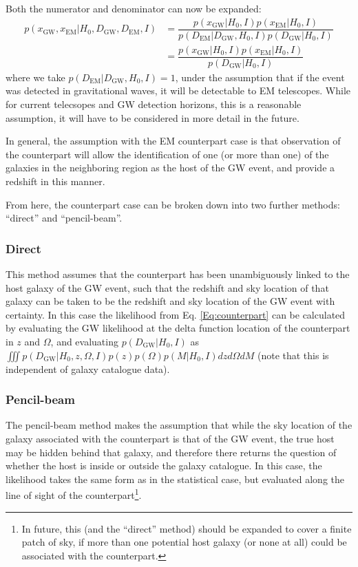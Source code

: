 \documentclass[a4paper,10pt]{article}
\begin{document}
Both the numerator and denominator can now be expanded:
\begin{equation} \label{Eq:counterpart}
\begin{aligned}
p(x_{\text{GW}},x_{\text{EM}}|H_0,D_{\text{GW}},D_{\text{EM}},I) &= \dfrac{p(x_{\text{GW}}|H_0,I) p(x_{\text{EM}}|H_0,I)}{p(D_{\text{EM}}|D_{\text{GW}},H_0,I) p(D_{\text{GW}}|H_0,I)} 
\\ &= \dfrac{p(x_{\text{GW}}|H_0,I) p(x_{\text{EM}}|H_0,I)}{p(D_{\text{GW}}|H_0,I)} 
\end{aligned} 
\end{equation}
where we take $p(D_{\text{EM}}|D_{\text{GW}},H_0,I) = 1$, under the assumption that if the event was detected in gravitational waves, it will be detectable to EM telescopes.  While for current telecsopes and GW detection horizons, this is a reasonable assumption, it will have to be considered in more detail in the future.

In general, the assumption with the EM counterpart case is that observation of the counterpart will allow the identification of one (or more than one) of the galaxies in the neighboring region as the host of the GW event, and provide a redshift in this manner.

From here, the counterpart case can be broken down into two further methods: ``direct'' and ``pencil-beam''. 

\subsubsection{Direct}
This method assumes that the counterpart has been unambiguously linked to the host galaxy of the GW event, such that the redshift and sky location of that galaxy can be taken to be the redshift and sky location of the GW event with certainty.  In this case the likelihood from Eq. \ref{Eq:counterpart} can be calculated by evaluating the GW likelihood at the delta function location of the counterpart in $z$ and $\Omega$, and evaluating $p(D_{\text{GW}}|H_0,I)$ as $\iiint p(D_{\text{GW}}|H_0,z,\Omega,I) p(z)p(\Omega)p(M|H_0,I) dz d\Omega dM$ (note that this is independent of galaxy catalogue data).



\subsubsection{Pencil-beam}
The pencil-beam method makes the assumption that while the sky location of the galaxy associated with the counterpart is that of the GW event, the true host may be hidden behind that galaxy, and therefore there returns the question of whether the host is inside or outside the galaxy catalogue.  In this case, the likelihood takes the same form as in the statistical case, but evaluated along the line of sight of the counterpart\footnote{In future, this (and the ``direct'' method) should be expanded to cover a finite patch of sky, if more than one potential host galaxy (or none at all) could be associated with the counterpart.}.
\end{document}
